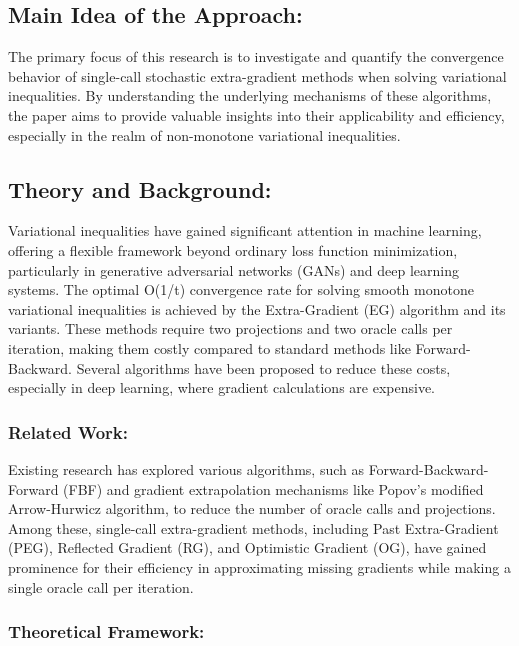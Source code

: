 \documentclass[11pt]{article}
\begin{document}
	\subsection{Main Idea of the Approach:}
        The primary focus of this research is to investigate and quantify the convergence behavior of single-call stochastic extra-gradient methods when solving variational inequalities. By understanding the underlying mechanisms of these algorithms, the paper aims to provide valuable insights into their applicability and efficiency, especially in the realm of non-monotone variational inequalities.
	
	\subsection{Theory and Background: }
 
        Variational inequalities have gained significant attention in machine learning, offering a flexible framework beyond ordinary loss function minimization, particularly in generative adversarial networks (GANs) and deep learning systems. The optimal O(1/t) convergence rate for solving smooth monotone variational inequalities is achieved by the Extra-Gradient (EG) algorithm and its variants. These methods require two projections and two oracle calls per iteration, making them costly compared to standard methods like Forward-Backward. Several algorithms have been proposed to reduce these costs, especially in deep learning, where gradient calculations are expensive.
	
		\subsubsection{Related Work: }
  
        Existing research has explored various algorithms, such as Forward-Backward-Forward (FBF) and gradient extrapolation mechanisms like Popov's modified Arrow-Hurwicz algorithm, to reduce the number of oracle calls and projections. Among these, single-call extra-gradient methods, including Past Extra-Gradient (PEG), Reflected Gradient (RG), and Optimistic Gradient (OG), have gained prominence for their efficiency in approximating missing gradients while making a single oracle call per iteration.
		
		\subsubsection{Theoretical Framework: }
  
\end{document}
